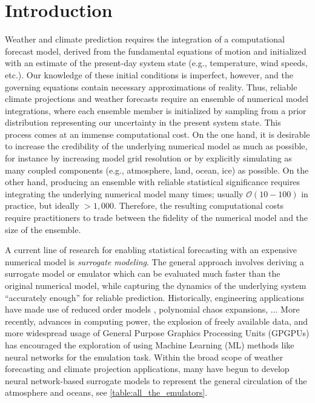 \section{Introduction}
\label{sec:intro}

Weather and climate prediction requires the integration of a computational
forecast model, derived from the fundamental equations of motion and initialized
with an estimate of the present-day system state (e.g., temperature, wind speeds,
etc.).
Our knowledge of these initial conditions is imperfect, however, and the governing
equations contain necessary approximations of reality.
Thus, reliable climate projections and weather forecasts require an
ensemble of numerical model integrations, where each ensemble member is
initialized by sampling from a prior distribution
representing our uncertainty in the present system state.
This process comes at an immense computational cost.
On the one hand, it is desirable to increase the credibility of the underlying
numerical model as much as possible,
for instance by increasing model grid resolution or by explicitly
simulating as many coupled components (e.g., atmosphere, land, ocean, ice) as
possible.
On the other hand, producing an ensemble with reliable statistical significance
requires integrating the underlying numerical model many times; usually
$\mathcal{O}(10-100)$ in practice, but ideally $>1,000$.
Therefore, the resulting computational costs require practitioners to trade between the
fidelity of the numerical model and the size of the ensemble.

A current line of research for enabling statistical forecasting with an
expensive numerical model is \textit{surrogate modeling}.
The general approach involves deriving a surrogate model or emulator which
can be evaluated much faster than the original numerical model, while
capturing the dynamics of the underlying system ``accurately enough'' for
reliable prediction.
Historically, engineering applications have made use of
reduced order models \citep{moore_linear_2022},
polynomial chaos expansions,
...
More recently, advances in computing power, the explosion of freely available data, and
more widespread usage of General Purpose Graphics Processing Units (GPGPUs) has
encouraged the exploration of using Machine Learning (ML) methods like neural
networks for the emulation task.
Within the broad scope of weather forecasting and climate projection
applications, many  have begun to develop
neural network-based surrogate models to represent the
general circulation of the atmosphere and oceans, see \cref{table:all_the_emulators}.

